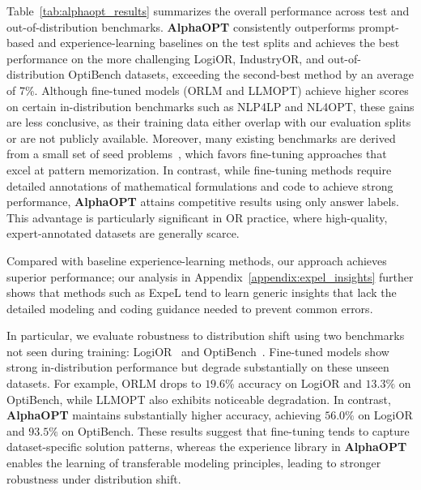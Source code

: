 \documentclass[sigconf, nonacm]{acmart}
\begin{document}
Table~\ref{tab:alphaopt_results} summarizes the overall performance across test and out-of-distribution benchmarks. \textbf{AlphaOPT} consistently outperforms prompt-based and experience-learning baselines on the test splits and achieves the best performance on the more challenging LogiOR, IndustryOR, and out-of-distribution OptiBench datasets, exceeding the second-best method by an average of 7\%. Although fine-tuned models (ORLM and LLMOPT) achieve higher scores on certain in-distribution benchmarks such as NLP4LP and NL4OPT, these gains are less conclusive, as their training data either overlap with our evaluation splits or are not publicly available. Moreover, many existing benchmarks are derived from a small set of seed problems~\citep{NL4OPT,huang2024mamo}, which favors fine-tuning approaches that excel at pattern memorization. In contrast, while fine-tuning methods require detailed annotations of mathematical formulations and code to achieve strong performance, \textbf{AlphaOPT} attains competitive results using only answer labels. This advantage is particularly significant in OR practice, where high-quality, expert-annotated datasets are generally scarce.

Compared with baseline experience-learning methods, our approach achieves superior performance; our analysis in Appendix~\ref{appendix:expel_insights} further shows that methods such as ExpeL tend to learn generic insights that lack the detailed modeling and coding guidance needed to prevent common errors.

In particular, we evaluate robustness to distribution shift using two benchmarks not seen during training: LogiOR~\citep{yang2025orthought} and OptiBench~\citep{yang2024optibench}. Fine-tuned models show strong in-distribution performance but degrade substantially on these unseen datasets. For example, ORLM drops to $19.6\%$ accuracy on LogiOR and $13.3\%$ on OptiBench, while LLMOPT also exhibits noticeable degradation. In contrast, \textbf{AlphaOPT} maintains substantially higher accuracy, achieving $56.0\%$ on LogiOR and $93.5\%$ on OptiBench. These results suggest that fine-tuning tends to capture dataset-specific solution patterns, whereas the experience library in \textbf{AlphaOPT} enables the learning of transferable modeling principles, leading to stronger robustness under distribution shift.
\end{document}
